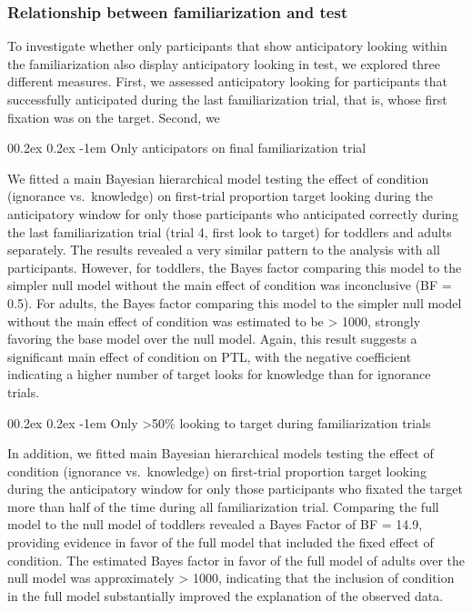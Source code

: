 \documentclass[
  english,
  man,floatsintext]{apa6}
\makeatletter
\let\oldparagraph\paragraph
\renewcommand{\paragraph}[1]{\oldparagraph{#1}\mbox{}}
\renewcommand{\paragraph}{\@startsection{paragraph}{4}{\parindent}%
  {0\baselineskip \@plus 0.2ex \@minus 0.2ex}%
  {-1em}%
  {\normalfont\normalsize\bfseries\itshape\typesectitle}}
\makeatother
\begin{document}
\hypertarget{relationship-between-familiarization-and-test}{%
\subsubsection{Relationship between familiarization and test}\label{relationship-between-familiarization-and-test}}

To investigate whether only participants that show anticipatory looking within the familiarization also display anticipatory looking in test, we explored three different measures. First, we assessed anticipatory looking for participants that successfully anticipated during the last familiarization trial, that is, whose first fixation was on the target. Second, we

\hypertarget{only-anticipators-on-final-familiarization-trial}{%
\paragraph{Only anticipators on final familiarization trial}\label{only-anticipators-on-final-familiarization-trial}}

We fitted a main Bayesian hierarchical model testing the effect of condition (ignorance vs.~knowledge) on first-trial proportion target looking during the anticipatory window for only those participants who anticipated correctly during the last familiarization trial (trial 4, first look to target) for toddlers and adults separately. The results revealed a very similar pattern to the analysis with all participants. However, for toddlers, the Bayes factor comparing this model to the simpler null model without the main effect of condition was inconclusive (BF = 0.5). For adults, the Bayes factor comparing this model to the simpler null model without the main effect of condition was estimated to be \textgreater{} 1000, strongly favoring the base model over the null model. Again, this result suggests a significant main effect of condition on PTL, with the negative coefficient indicating a higher number of target looks for knowledge than for ignorance trials.

\hypertarget{only-50-looking-to-target-during-familiarization-trials}{%
\paragraph{Only \textgreater50\% looking to target during familiarization trials}\label{only-50-looking-to-target-during-familiarization-trials}}

In addition, we fitted main Bayesian hierarchical models testing the effect of condition (ignorance vs.~knowledge) on first-trial proportion target looking during the anticipatory window for only those participants who fixated the target more than half of the time during all familiarization trial. Comparing the full model to the null model of toddlers revealed a Bayes Factor of BF = 14.9, providing evidence in favor of the full model that included the fixed effect of condition. The estimated Bayes factor in favor of the full model of adults over the null model was approximately \textgreater{} 1000, indicating that the inclusion of condition in the full model substantially improved the explanation of the observed data.
\end{document}
